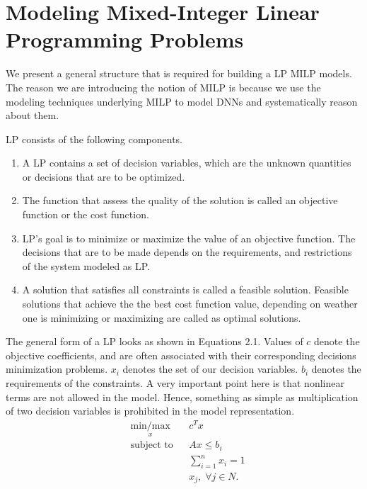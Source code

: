 \section{Modeling Mixed-Integer Linear Programming Problems}
\label{milp}
We present a general structure that is required for building a \ac{LP} \ac{MILP} models.
The reason we are introducing the notion of \ac{MILP} is because we use the modeling techniques underlying \ac{MILP} to model \ac{DNN}s and systematically reason about them. 


\ac{LP} consists of the following components. 

\begin{enumerate}
	\item A \ac{LP} contains a set of decision variables, which are the unknown quantities or decisions that are to be optimized. 
	\item The function that assess the quality of the solution is called an objective function or the cost function.
	\item \ac{LP}'s goal is to minimize or maximize the value of an objective function. 
	The decisions that are to be made depends on the requirements, and restrictions of the  system modeled as \ac{LP}.
	\item A solution that satisfies all constraints is called a feasible solution. 
	Feasible solutions that achieve the the best cost function value, depending on weather one is minimizing or maximizing are called as optimal solutions. 
\end{enumerate}


The general form of a \ac{LP} looks as shown in Equations 2.1. 
Values of $c$ denote the objective coefficients, and are often associated with their corresponding decisions minimization problems. 
$x_i$ denotes the set of our decision variables.
$b_i$ denotes the requirements of the constraints. 
A very important point here is that nonlinear terms are not allowed in the model. 
Hence, something as simple as multiplication of two decision variables is prohibited in the model representation. 
\begin{equation}
\begin{aligned}
& \underset{x}{\text{min/max}}
& & c^T x \\
& \text{subject to} & &  Ax \leq b_i \\
& & &  \sum_{i=1}^{n} x_i =1 \\
& & &  x_j, \; \forall j \in N. \\
\end{aligned}
\end{equation}

